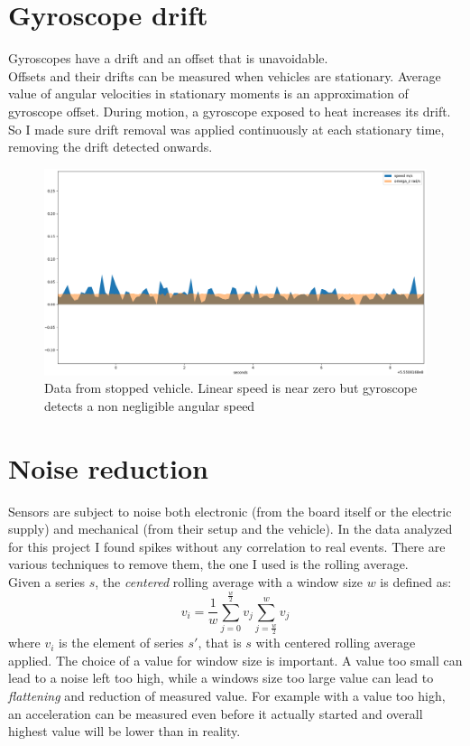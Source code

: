 \section{Gyroscope drift}
Gyroscopes have a drift and an offset that is unavoidable. \cite{6727722} \\
Offsets and their drifts can be measured when vehicles are stationary. Average value of angular velocities in stationary moments is an approximation of gyroscope offset.
During motion, a gyroscope exposed to heat increases its drift. So I made sure drift removal was applied continuously at each stationary time, removing the drift detected onwards. 
\begin{figure}[H]
\includegraphics[width=\textwidth]{gyro_drift.png}
\caption{Data from stopped vehicle. Linear speed is near zero but gyroscope detects a non negligible angular speed}
\end{figure}

\section{Noise reduction}
Sensors are subject to noise both electronic (from the board itself or the electric supply) and mechanical (from their setup and the vehicle). In the data analyzed for this project I found spikes without any correlation to real events.
There are various techniques to remove them, the one I used is the rolling average. \\ %
Given a series $s$, the \textit{centered} rolling average with a window size $w$ is defined as:
$$ v_i = \frac{1}{w} \sum_{j=0}^{\frac{w}{2}}v_j \sum_{j=\frac{w}{2}}^{w}v_j $$
where $v_i$ is the element of series $s'$, that is $s$ with centered rolling average applied.
The choice of a value for window size is important. A value too small can lead to a noise left too high, while a windows size too large value can lead to \textit{flattening} and reduction of measured value. For example with a value too high, an acceleration can be measured even before it actually started and overall highest value will be lower than in reality.

